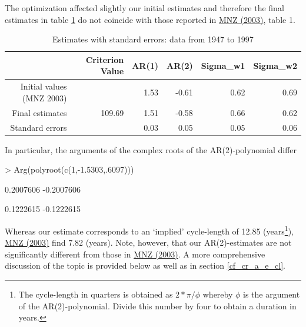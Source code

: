 \documentclass[a4paper]{book}
\begin{document}
\begin{enumerate}
\begin{Schunk}
\end{Schunk}
The optimization affected slightly our initial estimates and therefore the final estimates in table \ref{z_ss_uc0_t} do not coincide with those reported in \href{https://www.dropbox.com/s/1qn5h7s02c86j8i/mnz03.pdf?dl=0}{MNZ (2003)}, table 1.
\begin{table}[ht]
\centering
\begin{tabular}{rrrrrr}
  \hline
 & Criterion Value & AR(1) & AR(2) & Sigma\_w1 & Sigma\_w2 \\ 
  \hline
Initial values (MNZ 2003) &  & 1.53 & -0.61 & 0.62 & 0.69 \\ 
  Final estimates & 109.69 & 1.51 & -0.58 & 0.66 & 0.62 \\ 
  Standard errors &  & 0.03 & 0.05 & 0.05 & 0.06 \\ 
   \hline
\end{tabular}
\caption{Estimates with standard errors: data from 1947 to 1997} 
\label{z_ss_uc0_t}
\end{table}In particular, the arguments of the complex roots of the AR(2)-polynomial differ
\begin{Schunk}
\begin{Sinput}
> Arg(polyroot(c(1,-1.5303,.6097)))
\end{Sinput}
\begin{Soutput}
[1]  0.2007606 -0.2007606
\end{Soutput}
\begin{Soutput}
[1]  0.1222615 -0.1222615
\end{Soutput}
\end{Schunk}
Whereas our estimate corresponds to an `implied' cycle-length of 12.85 (years\footnote{The cycle-length in quarters is obtained as $2*\pi/\phi$ whereby $\phi$ is the argument of the AR(2)-polynomial. Divide this number by four to obtain a duration in years.}),  \href{https://www.dropbox.com/s/1qn5h7s02c86j8i/mnz03.pdf?dl=0}{MNZ (2003)} find 7.82 (years). Note, however, that our AR(2)-estimates are not significantly different from those in \href{https://www.dropbox.com/s/1qn5h7s02c86j8i/mnz03.pdf?dl=0}{MNZ (2003)}. A more comprehensive discussion of the topic is provided below as well as in section \ref{cf_cr_a_e_cl}.    

\end{enumerate}
\end{document}
